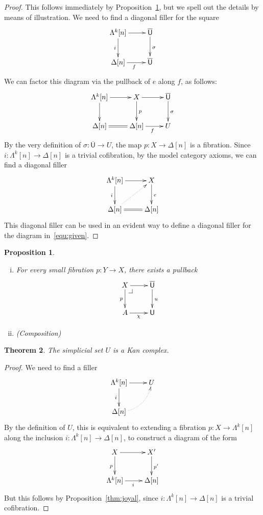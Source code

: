 \documentclass[reqno,10pt,a4paper,oneside]{amsart}
\makeatletter
\newcommand{\xycenter}[1]{\vcenter{\hbox{\xymatrix{#1}}}}
\newcommand{\drpullback}[1][dr]{\save*!/#1-1.2pc/#1:(-1,1)@^{|-}\restore}
\newcommand{\ie}{\text{i.e.\ }}
\newtheorem{theorem}{Theorem}[section]
\newtheorem{proposition}[theorem]{Proposition}
\theoremstyle{definition}
\newcommand{\co}{\colon}
\newcommand{\UU}{\overline{\mathsf{U}}}
\newcommand{\U}{\mathsf{U}}
\makeatother
\begin{document}
\begin{proof} This follows immediately by Proposition~\ref{thm:classifier}, but we 
spell out the details by means of illustration. We need to find a diagonal filler for the square
\begin{equation}
\label{equ:given}
\xycenter{
\Lambda^k[n] \ar[r] \ar[d]_i & \UU \ar[d]^\sigma \\
\Delta[n] \ar[r]_f & \UU }
\end{equation}
We can factor this diagram via the pullback of $e$ along $f$, as follows:
\[
\xymatrix{
\Lambda^k[n] \ar[r] \ar[d] & X \ar[r] \ar[d]^p &  \UU \ar[d]^\sigma \\ 
\Delta[n] \ar@{=}[r] & \Delta[n] \ar[r]_f & U }
\]
By the very definition of $\sigma \co \UU \to U$, the map $p \co X \to \Delta[n]$ is a fibration. 
Since  $i  \co \Lambda^k[n] \to \Delta[n]$ is a trivial cofibration, by
the model category axioms, we can find a diagonal filler 
\[
\xymatrix{
  \Lambda^k[n]   \ar[r] \ar[d]_i &  X \ar[d]^e \\ 
 \Delta[n]  \ar@{=}[r] \ar@{.>}[ur] & \Delta[n] }
\]
This diagonal filler can be used in an evident way to define a diagonal filler for the diagram in~\eqref{equ:given}.
\end{proof}


\begin{proposition} \label{thm:classifier} \hfill
\begin{enumerate}[(i)]
\item For every small fibration $p \co Y \to X$, there exists a pullback
\[
\xymatrix{
X \ar[r] \ar[d]_p  \drpullback & \UU \ar[d]^{u} \\
A \ar[r]_{\chi} & \U}
\]
\item (Composition)
\end{enumerate}
\end{proposition}





\begin{theorem} The simplicial set $U$ is a Kan complex.
\end{theorem}

\begin{proof} We need to find a filler
\[
\xymatrix{
\Lambda^k[n] \ar[r] \ar[d]_{i} & U \\
\Delta[n] \ar@/_1pc/@{.>}[ur] & }
\]
By the definition of $U$, this is equivalent to extending a fibration $p \co X \to \Lambda^k[n]$ 
along the inclusion $i \co \Lambda^k[n] \to \Delta[n]$, \ie to construct a diagram of the form
\[
\xymatrix{
X \ar[r] \ar[d]_{p} & X' \ar[d]^{p'} \\ 
\Lambda^k[n] \ar[r]_{i} & \Delta[n] }
\]
But this follows by Proposition~\ref{thm:joyal}, since $i  \co \Lambda^k[n] \to \Delta[n]$ is a trivial cofibration.
\end{proof}
\end{document}

